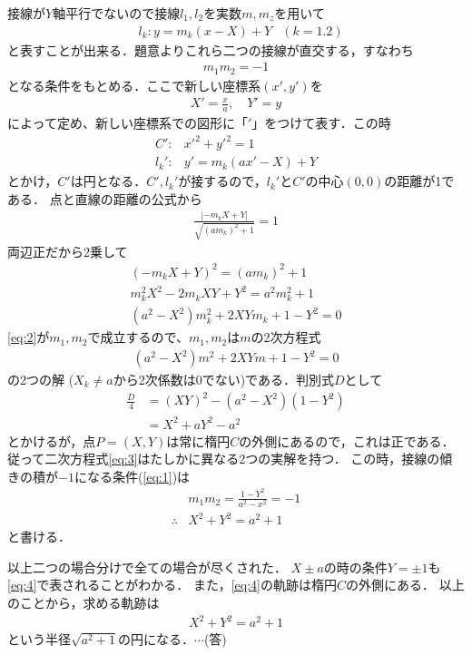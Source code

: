 \documentclass[a4paper,10pt]{ltjsarticle}
\begin{document}
\begin{multicols}{2}
  接線が$Y$軸平行でないので接線$l_1, l_2$を実数$m, m_z$を用いて
  \begin{align*}
     & l_k: y = m_k(x-X)+Y & (k=1.2)
  \end{align*}
  と表すことが出来る．題意よりこれら二つの接線が直交する，すなわち
  \begin{align}
    m_1m_2=-1 \label{eq:1}
  \end{align}
  となる条件をもとめる．ここで新しい座標系$(x', y')$を
  \begin{align*}
    X'=\frac{x}{a}, \quad Y'=y
  \end{align*}
  によって定め、新しい座標系での図形に「$'$」をつけて表す．この時
  \begin{align*}
    C':   & x'^2+y'^2=1     \\
    l_k': & y'=m_k(ax'-X)+Y
  \end{align*}
  とかけ，$C'$は円となる．$C', l_k'$が接するので，$l_k'$と$C'$の中心$(0,0)$の距離が1である．
  点と直線の距離の公式から
  \begin{align*}
    \frac{|-m_k X+Y|}{\sqrt{(am_k)^2+1}}=1
  \end{align*}
  両辺正だから2乗して
  \begin{align}
    (-m_k X+Y)^2 = (am_k)^2+1 \nonumber                 \\
    m_k^2 X^2 - 2m_k XY + Y^2 = a^2 m_k^2 + 1 \nonumber \\
    (a^2-X^2)m_k^2 + 2XY m_k + 1- Y^2 = 0 \label{eq:2}
  \end{align}
  \cref{eq:2}が$m_1, m_2$で成立するので、$m_1, m_2$は$m$の2次方程式
  \begin{align}
    (a^2-X^2)m^2+2XY m + 1-Y^2 = 0   \label{eq:3}
  \end{align}
  の2つの解 ($X_k \neq a$から2次係数は$0$でない)である．判別式$D$として
  \begin{align*}
    \frac{D}{4}
     & =(XY)^2-(a^2-X^2)(1-Y^2) \\
     & =X^2 + aY^2-a^2
  \end{align*}
  とかけるが，点$P=(X,Y)$は常に楕円$C$の外側にあるので，これは正である．
  従って二次方程式\cref{eq:3}はたしかに異なる2つの実解を持つ．
  この時，接線の傾きの積が$-1$になる条件(\cref{eq:1})は
  \begin{align}
     & m_1m_2 = \frac{1-Y^2}{a^2-x^2}=-1 \nonumber \\
    \therefore
     & X^2+Y^2=a^2+1  \label{eq:4}
  \end{align}
  と書ける．

  以上二つの場合分けで全ての場合が尽くされた．
  $X\pm a$の時の条件$Y=\pm 1$も\cref{eq:4}で表されることがわかる．
  また，\cref{eq:4}の軌跡は楕円$C$の外側にある．
  以上のことから，求める軌跡は
  \begin{align*}
    X^2+Y^2=a^2+1
  \end{align*}
  という半径$\sqrt{a^2+1}$の円になる．$\cdots$(答)


\end{multicols}
\end{document}

